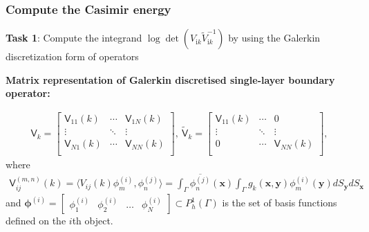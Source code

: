 \documentclass[dvipsnames,10pt]{beamer}
\begin{document}
\begin{frame}
    \frametitle{Compute the Casimir energy}
    \textbf{Task 1}: Compute the integrand $\log\det\left(V_{\mathrm{i}k}\tilde{V}_{\mathrm{i}k}^{-1}\right)$ by using the Galerkin discretization form of operators
\vspace{0.3cm}

\textbf{Matrix representation of Galerkin discretised single-layer boundary operator:}

\begin{align*}
    \mathsf{V}_{k} = \begin{bmatrix}
        \mathsf{V}_{11}(k) & \cdots & \mathsf{V}_{1N}(k) \\
        \vdots & \ddots & \vdots \\
        \mathsf{V}_{N1}(k)  & \cdots & \mathsf{V}_{NN}(k) \\
\end{bmatrix}, \ 
\tilde{\mathsf{V}}_{k} =  \begin{bmatrix}
        \mathsf{V}_{11}(k)     & \cdots & 0 \\
    \vdots & \ddots & \vdots \\
    0          & \cdots & \mathsf{V}_{NN}(k) \\
\end{bmatrix},
\end{align*}
where \begin{align*}
    \mathsf{V}_{ij}^{(m,n)} (k) = \langle V_{ij}(k)\phi_{m}^{(i)}, \phi_{n}^{(j)}\rangle = 
    \int_{\Gamma}\overline{\phi_{n}^{(j)}}(\boldsymbol{x})\int_{\Gamma}g_{k}(\boldsymbol{x}, \boldsymbol{y})\phi_{m}^{(i)}(\boldsymbol{y})dS_{\boldsymbol{y}}dS_{\boldsymbol{x}}
\end{align*}   
and $\boldsymbol{\phi}^{(i)} = \begin{bmatrix}
    \phi_{1}^{(i)} & \phi_{2}^{(i)} & \dots & \phi_{N}^{(i)}
\end{bmatrix}\subset P_{h}^{1}(\Gamma)$  is the set of basis functions defined on the $i$th object.
\end{frame}
\end{document}
